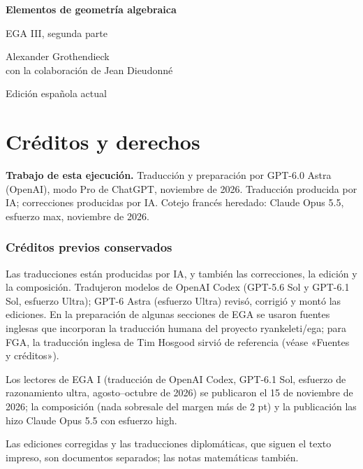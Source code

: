 \documentclass[10pt,oneside,openany]{book}
\theoremstyle{egaenv}\newtheorem*{env}{---}
\theoremstyle{egastatement}
\theoremstyle{egadescription}
\begin{document}
\begin{titlepage}\centering\vspace*{20mm}
{\Huge\bfseries Elementos de geometría algebraica\par}\vspace{14mm}
{\LARGE EGA III, segunda parte\par}\vspace{10mm}
{\large Alexander Grothendieck\\con la colaboración de Jean Dieudonné\par}
\vfill{\Large Edición española actual\par}
\vspace{8mm}{\large 25 de noviembre de 2026\par}\end{titlepage}
\chapter*{Créditos y derechos}
\noindent\textbf{Trabajo de esta ejecución.} Traducción y preparación por GPT-6.0 Astra (OpenAI), modo Pro de ChatGPT, noviembre de 2026. Traducción producida por IA; correcciones producidas por IA. Cotejo francés heredado: Claude Opus 5.5, esfuerzo max, noviembre de 2026.

\subsection*{Créditos previos conservados}

Las traducciones están producidas por IA, y también las correcciones, la edición y la composición. Tradujeron
modelos de OpenAI Codex (GPT-5.6 Sol y GPT-6.1 Sol, esfuerzo Ultra); GPT-6 Astra (esfuerzo Ultra) revisó, corrigió
y montó las ediciones. En la
preparación de algunas secciones de EGA se usaron fuentes inglesas que incorporan la traducción humana del proyecto
ryankeleti/ega; para FGA, la traducción inglesa de Tim Hosgood sirvió de referencia (véase «Fuentes y créditos»).

Los lectores de EGA I (traducción de OpenAI Codex, GPT-6.1 Sol, esfuerzo de razonamiento ultra, agosto–octubre
de 2026) se publicaron el 15 de noviembre de 2026; la composición (nada sobresale del margen más de 2 pt) y la
publicación las hizo Claude Opus 5.5 con esfuerzo high.

Las ediciones corregidas y las traducciones diplomáticas, que siguen el texto impreso, son documentos separados; las
notas matemáticas también.
\end{document}

